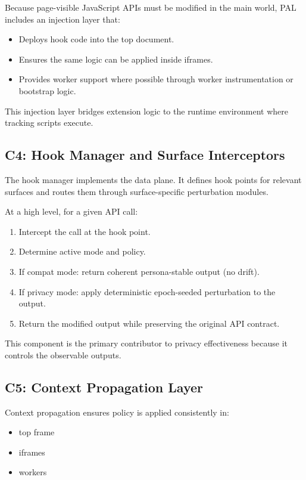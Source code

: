 \documentclass[11pt]{report}
\begin{document}
Because page-visible JavaScript APIs must be modified in the main world, PAL includes an injection layer that:
\begin{itemize}
    \item Deploys hook code into the top document.
    \item Ensures the same logic can be applied inside iframes.
    \item Provides worker support where possible through worker instrumentation or bootstrap logic.
\end{itemize}

This injection layer bridges extension logic to the runtime environment where tracking scripts execute.

\subsection{C4: Hook Manager and Surface Interceptors}

The hook manager implements the data plane. It defines hook points for relevant surfaces and routes them through surface-specific perturbation modules.

At a high level, for a given API call:
\begin{enumerate}
    \item Intercept the call at the hook point.
    \item Determine active mode and policy.
    \item If compat mode: return coherent persona-stable output (no drift).
    \item If privacy mode: apply deterministic epoch-seeded perturbation to the output.
    \item Return the modified output while preserving the original API contract.
\end{enumerate}

This component is the primary contributor to privacy effectiveness because it controls the observable outputs.

\subsection{C5: Context Propagation Layer}

Context propagation ensures policy is applied consistently in:
\begin{itemize}
    \item top frame
    \item iframes
    \item workers
\end{itemize}
\end{document}
